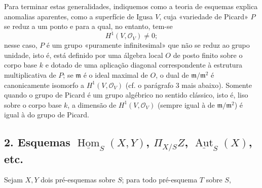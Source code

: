 \documentclass[11pt,twoside,openany]{book}
\numberwithin{equation}{section}
\theoremstyle{plain}
\theoremstyle{definition}
\theoremstyle{remark}
\begin{document}
Para terminar estas generalidades, indiquemos como a teoria de esquemas
explica anomalias aparentes, como a superfície de Igusa $V$, cuja «variedade
de Picard» $P$ se reduz a um ponto e para a qual, no entanto, tem-se
\[
  H^1(V,\mathcal O_V)\ne 0 ;
\]
nesse caso, $P$ é um grupo «puramente infinitesimal» que não se reduz ao
grupo unidade, isto é, está definido por uma álgebra local $O$ de posto finito
sobre o corpo base $k$ e dotado de uma aplicação diagonal correspondente à
estrutura multiplicativa de $P$; se $\mathfrak m$ é o ideal maximal de
$O$, o dual de $\mathfrak m/\mathfrak m^2$ é canonicamente isomorfo a
$H^1(V,\mathcal O_V)$ (cf. o parágrafo 3 mais abaixo). Somente quando o grupo de
Picard é um grupo algébrico no sentido clássico, isto é, liso sobre o
corpo base $k$, a dimensão de $H^1(V,\mathcal O_V)$ (sempre igual à de
$\mathfrak m/\mathfrak m^2$) é igual à do grupo de Picard.

\subsection*{2. Esquemas $\underline{\operatorname{Hom}}_S(X,Y)$,
$\Pi_{X/S}Z$, $\underline{\operatorname{Aut}}_S(X)$, etc.}

Sejam $X,Y$ dois pré-esquemas sobre $S$; para todo pré-esquema $T$ sobre $S$,
\end{document}
